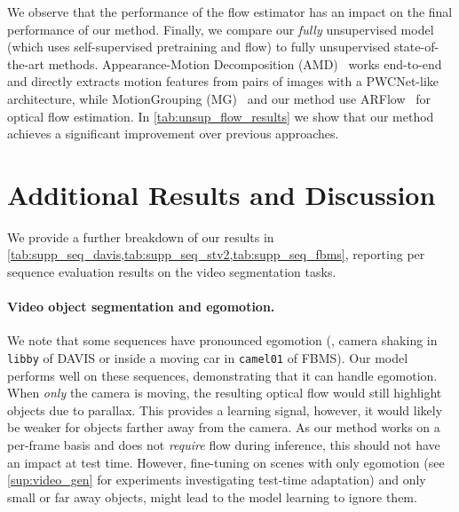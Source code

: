 We observe that the performance of the flow estimator has an impact on the final performance of our method.
Finally, we compare our \emph{fully} unsupervised model (which uses self-supervised pretraining and flow) to fully unsupervised state-of-the-art methods.
Appearance-Motion Decomposition (AMD)~\cite{liu2021emergence} works end-to-end and directly extracts motion features from pairs of images with a PWCNet-like architecture, while MotionGrouping (MG)~\cite{yang2021self-supervised} and our method use ARFlow~\cite{liu2020learning} for optical flow estimation.
In \cref{tab:unsup_flow_results} we show that our method achieves a significant improvement over previous approaches.


\section{Additional Results and Discussion}\label{sup:sec4}
We provide a further breakdown of our results in \cref{tab:supp_seq_davis,tab:supp_seq_stv2,tab:supp_seq_fbms}, reporting per sequence evaluation results on the video segmentation tasks.

\paragraph{Video object segmentation and egomotion.}
We note that some sequences have pronounced egomotion (\eg, camera shaking in \texttt{libby} of DAVIS or inside a moving car in \texttt{camel01} of FBMS). 
Our model performs well on these sequences, demonstrating that it can handle egomotion. 
When \emph{only} the camera is moving, the resulting optical flow would still highlight objects due to parallax.
This provides a learning signal, however, it would likely be
weaker for objects farther away from the camera.
As our method works on a per-frame basis and does not \emph{require} flow during inference, this should not have an impact at test time. 
However, fine-tuning on scenes with only egomotion (see \cref{sup:video_gen} for experiments investigating test-time adaptation)   and only small or far away objects, might lead to the model learning to ignore them.

